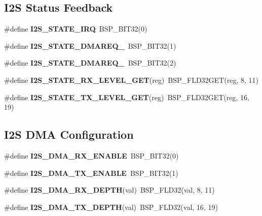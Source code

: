 \subsection*{I2S Status Feedback}
\begin{DoxyCompactItemize}
\item 
\mbox{\label{group__lpc__i2s_gaa412bd295235fcd4d7f0ad284d9386de}} 
\#define {\bfseries I2\+S\+\_\+\+S\+T\+A\+T\+E\+\_\+\+I\+RQ}~B\+S\+P\+\_\+\+B\+I\+T32(0)
\item 
\mbox{\label{group__lpc__i2s_gaad41b57f776db62c34f29fe9fca750ec}} 
\#define {\bfseries I2\+S\+\_\+\+S\+T\+A\+T\+E\+\_\+\+D\+M\+A\+R\+E\+Q\+\_}~B\+S\+P\+\_\+\+B\+I\+T32(1)
\item 
\mbox{\label{group__lpc__i2s_ga0f7620a81e28f7f88372fd2aa458bb53}} 
\#define {\bfseries I2\+S\+\_\+\+S\+T\+A\+T\+E\+\_\+\+D\+M\+A\+R\+E\+Q\+\_}~B\+S\+P\+\_\+\+B\+I\+T32(2)
\item 
\mbox{\label{group__lpc__i2s_ga9dbd8582b58986d3e341530125edcc4b}} 
\#define {\bfseries I2\+S\+\_\+\+S\+T\+A\+T\+E\+\_\+\+R\+X\+\_\+\+L\+E\+V\+E\+L\+\_\+\+G\+ET}(reg)~B\+S\+P\+\_\+\+F\+L\+D32\+G\+ET(reg, 8, 11)
\item 
\mbox{\label{group__lpc__i2s_ga97692f1b20225e89eaf8f850e7ec4126}} 
\#define {\bfseries I2\+S\+\_\+\+S\+T\+A\+T\+E\+\_\+\+T\+X\+\_\+\+L\+E\+V\+E\+L\+\_\+\+G\+ET}(reg)~B\+S\+P\+\_\+\+F\+L\+D32\+G\+ET(reg, 16, 19)
\end{DoxyCompactItemize}
\subsection*{I2S D\+MA Configuration}
\begin{DoxyCompactItemize}
\item 
\mbox{\label{group__lpc__i2s_gae051388bf2b2b82224d995e2e32d483a}} 
\#define {\bfseries I2\+S\+\_\+\+D\+M\+A\+\_\+\+R\+X\+\_\+\+E\+N\+A\+B\+LE}~B\+S\+P\+\_\+\+B\+I\+T32(0)
\item 
\mbox{\label{group__lpc__i2s_ga12d8da3c59d7ddf9937182fbeb952667}} 
\#define {\bfseries I2\+S\+\_\+\+D\+M\+A\+\_\+\+T\+X\+\_\+\+E\+N\+A\+B\+LE}~B\+S\+P\+\_\+\+B\+I\+T32(1)
\item 
\mbox{\label{group__lpc__i2s_ga97467d29af5ba8aaa7bede410217181a}} 
\#define {\bfseries I2\+S\+\_\+\+D\+M\+A\+\_\+\+R\+X\+\_\+\+D\+E\+P\+TH}(val)~B\+S\+P\+\_\+\+F\+L\+D32(val, 8, 11)
\item 
\mbox{\label{group__lpc__i2s_ga6af0374f87748ec329ca138d5b9fd857}} 
\#define {\bfseries I2\+S\+\_\+\+D\+M\+A\+\_\+\+T\+X\+\_\+\+D\+E\+P\+TH}(val)~B\+S\+P\+\_\+\+F\+L\+D32(val, 16, 19)
\end{DoxyCompactItemize}
